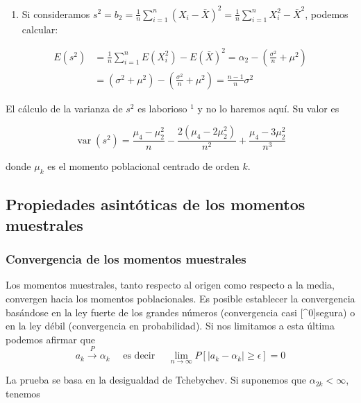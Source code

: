\documentclass[
]{article}
\providecommand{\tightlist}{%
  \setlength{\itemsep}{0pt}\setlength{\parskip}{0pt}}
\begin{document}
\begin{enumerate}
\def\labelenumi{\arabic{enumi}.}
\setcounter{enumi}{1}
\tightlist
\item
  Si consideramos \(s^{2}=b_{2}=\frac{1}{n} \sum_{i=1}^{n}\left(X_{i}-\bar{X}\right)^{2}=\frac{1}{n} \sum_{i=1}^{n} X_{i}^{2}-\bar{X}^{2}\), podemos calcular:
\end{enumerate}

\[
\begin{aligned}
E\left(s^{2}\right) & =\frac{1}{n} \sum_{i=1}^{n} E\left(X_{i}^{2}\right)-E(\bar{X})^{2}=\alpha_{2}-\left(\frac{\sigma^{2}}{n}+\mu^{2}\right) \\
& =\left(\sigma^{2}+\mu^{2}\right)-\left(\frac{\sigma^{2}}{n}+\mu^{2}\right)=\frac{n-1}{n} \sigma^{2}
\end{aligned}
\]

El cálculo de la varianza de \(s^{2}\) es laborioso \({ }^{1}\) y no lo haremos aquí. Su valor es

\[
\operatorname{var}\left(s^{2}\right)=\frac{\mu_{4}-\mu_{2}^{2}}{n}-\frac{2\left(\mu_{4}-2 \mu_{2}^{2}\right)}{n^{2}}+\frac{\mu_{4}-3 \mu_{2}^{2}}{n^{3}}
\]

donde \(\mu_{k}\) es el momento poblacional centrado de orden \(k\).

\subsection{Propiedades asintóticas de los momentos muestrales}\label{propiedades-asintuxf3ticas-de-los-momentos-muestrales}

\subsubsection{Convergencia de los momentos muestrales}\label{convergencia-de-los-momentos-muestrales}

Los momentos muestrales, tanto respecto al origen como respecto a la media, convergen hacia los momentos poblacionales. Es posible establecer la convergencia basándose en la ley fuerte de los grandes números (convergencia casi {[}\^{}0{]}segura) o en la ley débil (convergencia en probabilidad). Si nos limitamos a esta última podemos afirmar que
\[
a_{k} \xrightarrow{P} \alpha_{k} \quad \text { es decir } \quad \lim _{n \rightarrow \infty} P\left[\left|a_{k}-\alpha_{k}\right| \geq \epsilon\right]=0
\]

La prueba se basa en la desigualdad de Tchebychev. Si suponemos que \(\alpha_{2 k}<\infty\), tenemos
\end{document}
